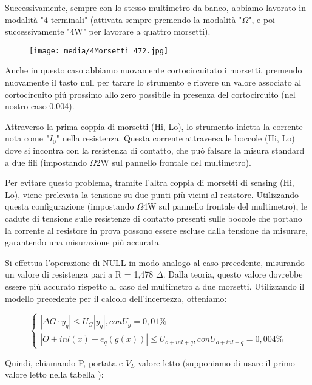 Successivamente, sempre con lo stesso multimetro da banco, abbiamo lavorato in modalità "4 terminali" (attivata sempre premendo la modalità "$\Omega$", e poi successivamente "4W" per lavorare a quattro morsetti).

\begin{figure}[h]
    \centering
    \texttt{[image: media/4Morsetti\_472.jpg]}
    \label{fig:4morsetti}
\end{figure}
Anche in questo caso abbiamo nuovamente cortocircuitato i morsetti, premendo nuovamente il tasto null per tarare lo strumento e riavere un valore associato al cortocircuito pi\'u prossimo allo zero possibile in presenza del cortocircuito (nel nostro caso 0,004).


Attraverso la prima coppia di morsetti (Hi, Lo), lo strumento inietta la corrente nota come "$I_0$" nella resistenza. Questa corrente attraversa le boccole (Hi, Lo) dove si incontra con la resistenza di contatto, che può falsare la misura standard a due fili (impostando $\Omega$2W sul pannello frontale del multimetro).

Per evitare questo problema, tramite l'altra coppia di morsetti di sensing (Hi, Lo), viene prelevata la tensione su due punti più vicini al resistore. Utilizzando questa configurazione (impostando $\Omega$4W sul pannello frontale del multimetro), le cadute di tensione sulle resistenze di contatto presenti sulle boccole che portano la corrente al resistore in prova possono essere escluse dalla tensione da misurare, garantendo una misurazione più accurata.

Si effettua l'operazione di NULL in modo analogo al caso precedente, misurando un valore di resistenza pari a R = 1,478 $\Delta$. Dalla teoria, questo valore dovrebbe essere più accurato rispetto al caso del multimetro a due morsetti. Utilizzando il modello precedente per il calcolo dell'incertezza, otteniamo:

\begin{equation}
    \left\{\begin{array}{l}
| \Delta G \cdot y_q | \leq U_G |y_q|,    con U_g=0,01\%
\\ | O + inl(x) + e_q(g(x)) | \leq U_{o+inl+q}, con U_{o+inl+q}=0,004\%
\end{array}\right.
\end{equation}


    


Quindi, chiamando P, portata e $V_L$ valore letto (supponiamo di usare il primo valore letto nella tabella \label{mult_port}):


